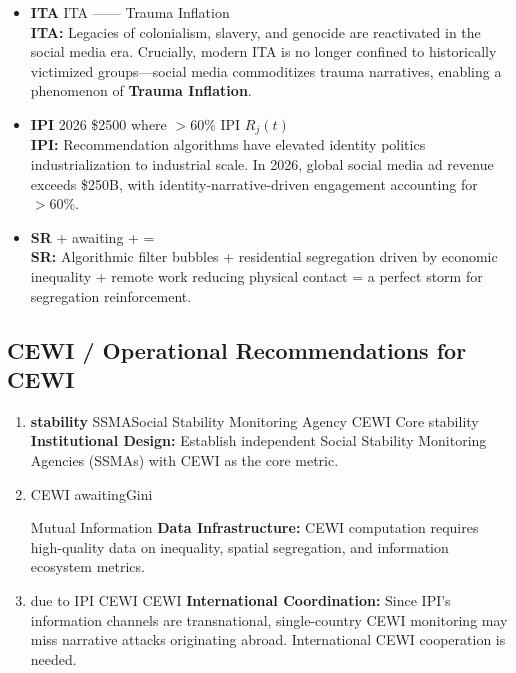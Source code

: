 \documentclass[11pt,a4paper]{article}
\theoremstyle{remark}
\begin{document}
\begin{itemize}
    \item \textbf{ITA} 
           ITA ——
          \textit{}\normalfont\textbf{}
          Trauma Inflation
          \\[2pt]
          \textbf{ITA:} Legacies of colonialism, slavery, and genocide are reactivated
          in the social media era. Crucially, modern ITA is no longer confined to
          historically victimized groups—social media commoditizes trauma narratives,
          enabling a phenomenon of \textbf{Trauma Inflation}.

    \item \textbf{IPI} 
          2026  \$2500 where
           $>60\%$
          IPI  $R_j(t)$ 
          \\[2pt]
          \textbf{IPI:} Recommendation algorithms have elevated identity politics
          industrialization to industrial scale. In 2026, global social media ad
          revenue exceeds \$250B, with identity-narrative-driven engagement accounting
          for $>60\%$.

    \item \textbf{SR}  + awaiting + 
           = 
          \\[2pt]
          \textbf{SR:} Algorithmic filter bubbles + residential segregation driven by
          economic inequality + remote work reducing physical contact = a perfect storm
          for segregation reinforcement.
\end{itemize}

\subsection{CEWI  / Operational Recommendations for CEWI}

\begin{enumerate}
    \item \textbf{} \textbf{stability}
          SSMASocial Stability Monitoring Agency CEWI Core
          stability\hfill
          \textbf{Institutional Design:} Establish independent Social Stability
          Monitoring Agencies (SSMAs) with CEWI as the core metric.

    \item \textbf{} CEWI 
          awaitingGini 
          
          Mutual Information\hfill
          \textbf{Data Infrastructure:} CEWI computation requires high-quality data
          on inequality, spatial segregation, and information ecosystem metrics.

    \item \textbf{} due to IPI 
           CEWI 
           CEWI \hfill
          \textbf{International Coordination:} Since IPI's information channels are
          transnational, single-country CEWI monitoring may miss narrative attacks
          originating abroad. International CEWI cooperation is needed.
\end{enumerate}
\end{document}
